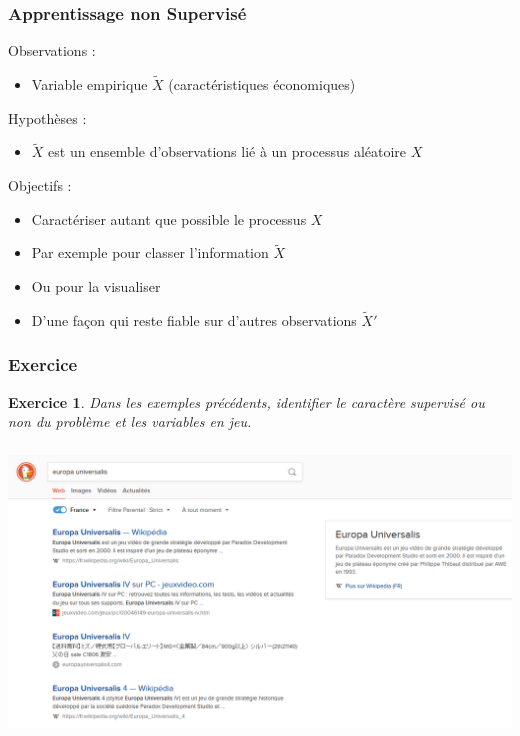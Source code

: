 \documentclass[11pt]{beamer}
\newenvironment{slide}[1]{%
\begin{frame}[environment=slide]
\frametitle{#1}
}{%
\end{frame}
}
\newtheorem{exercice}{Exercice}
\begin{document}
\begin{slide}{Apprentissage non Supervisé}

Observations :\\

\begin{itemize}

\item Variable empirique $\tilde{X}$ (caractéristiques économiques)

\end{itemize}

\pause

Hypothèses :\\

\begin{itemize}

\item $\tilde{X}$ est un ensemble d'observations lié à un processus aléatoire $X$

\end{itemize}

\pause

Objectifs :\\

\begin{itemize}
\item Caractériser autant que possible le processus $X$
\item Par exemple pour classer l'information $\tilde{X}$
\item Ou pour la visualiser
\item D'une façon qui reste fiable sur d'autres observations $\tilde{X}'$
\end{itemize}

\end{slide}

\begin{slide}{Exercice}
\begin{exercice}
Dans les exemples précédents, identifier le caractère supervisé ou non du problème et les variables en jeu.
\end{exercice}
\end{slide}


\begin{slide}{}

\includegraphics[scale=0.25]{A1ranking}

\end{slide}
\end{document}
